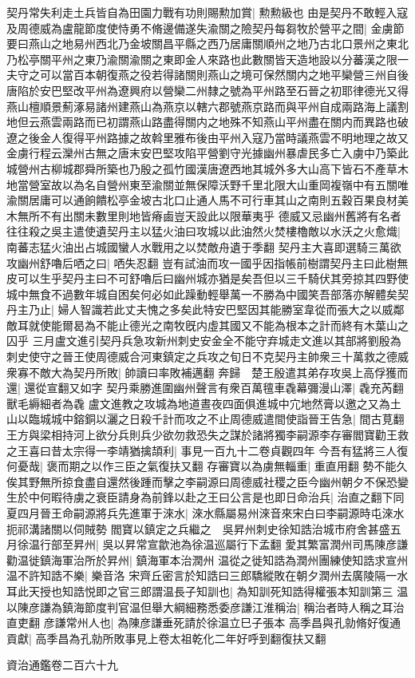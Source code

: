 契丹常失利走土兵皆自為田園力戰有功則賜勲加賞|{
	勲勲級也}
由是契丹不敢輕入寇及周德威為盧龍節度使恃勇不脩邊備遂失渝關之險契丹每芻牧於營平之間|{
	金虜節要曰燕山之地易州西北乃金坡關昌平縣之西乃居庸關順州之地乃古北口景州之東北乃松亭關平州之東乃渝關渝關之東即金人來路也此數關皆天造地設以分蕃漢之限一夫守之可以當百本朝復燕之役若得諸關則燕山之境可保然關内之地平欒營三州自後唐陷於安巴堅改平州為遼興府以營欒二州隸之號為平州路至石晉之初耶律德光又得燕山檀順景薊涿易諸州建燕山為燕京以轄六郡號燕京路而與平州自成兩路海上議割地但云燕雲兩路而已初謂燕山路盡得關内之地殊不知燕山平州盡在關内而異路也破遼之後金人復得平州路據之故斡里雅布後由平州入寇乃當時議燕雲不明地理之故又金虜行程云灤州古無之唐末安巴堅攻陷平營劉守光據幽州暴虐民多亡入虜中乃築此城營州古柳城郡舜所築也乃殷之孤竹國漢唐遼西地其城外多大山高下皆石不產草木地當營室故以為名自營州東至渝關並無保障沃野千里北限大山重岡複嶺中有五關唯渝關居庸可以通餉饋松亭金坡古北口止通人馬不可行車其山之南則五穀百果良材美木無所不有出關未數里則地皆瘠鹵豈天設此以限華夷乎}
德威又忌幽州舊將有名者往往殺之吳主遣使遺契丹主以猛火油曰攻城以此油然火焚樓櫓敵以水沃之火愈熾|{
	南蕃志猛火油出占城國蠻人水戰用之以焚敵舟遺于季翻}
契丹主大喜即選騎三萬欲攻幽州舒嚕后哂之曰|{
	哂失忍翻}
豈有試油而攻一國乎因指帳前樹謂契丹主曰此樹無皮可以生乎契丹主曰不可舒嚕后曰幽州城亦猶是矣吾但以三千騎伏其旁掠其四野使城中無食不過數年城自困矣何必如此躁動輕舉萬一不勝為中國笑吾部落亦解體矣契丹主乃止|{
	婦人智識若此丈夫愧之多矣此特安巴堅因其能勝室韋從而張大之以威鄰敵耳就使能爾曷為不能止德光之南牧旣内虛其國又不能為根本之計而終有木葉山之囚乎}
三月盧文進引契丹兵急攻新州刺史安金全不能守弃城走文進以其部將劉殷為刺史使守之晉王使周德威合河東鎮定之兵攻之旬日不克契丹主帥衆三十萬救之德威衆寡不敵大為契丹所敗|{
	帥讀曰率敗補邁翻}
奔歸　楚王殷遣其弟存攻吳上高俘獲而還|{
	還從宣翻又如字}
契丹乘勝進圍幽州聲言有衆百萬氊車毳幕彌漫山澤|{
	毳充芮翻獸毛縟細者為毳}
盧文進教之攻城為地道晝夜四面俱進城中宂地然膏以邀之又為土山以臨城城中鎔銅以灑之日殺千計而攻之不止周德威遣間使詣晉王告急|{
	間古莧翻}
王方與梁相持河上欲分兵則兵少欲勿救恐失之謀於諸將獨李嗣源李存審閻寶勸王救之王喜曰昔太宗得一李靖猶擒頡利|{
	事見一百九十二卷貞觀四年}
今吾有猛將三人復何憂哉|{
	褒而期之以作三臣之氣復扶又翻}
存審寶以為虜無輜重|{
	重直用翻}
勢不能久俟其野無所掠食盡自還然後踵而擊之李嗣源曰周德威社稷之臣今幽州朝夕不保恐變生於中何暇待虜之衰臣請身為前鋒以赴之王曰公言是也即日命治兵|{
	治直之翻下同}
夏四月晉王命嗣源將兵先進軍于淶水|{
	淶水縣屬易州淶音來宋白曰李嗣源時屯淶水扼祁溝諸關以伺賊勢}
閻寶以鎮定之兵繼之　吳昇州刺史徐知誥治城市府舍甚盛五月徐温行部至昇州|{
	吳以昇常宣歙池為徐温巡屬行下孟翻}
愛其繁富潤州司馬陳彦謙勸温徙鎮海軍治所於昇州|{
	鎮海軍本治潤州}
温從之徙知誥為潤州團練使知誥求宣州温不許知誥不樂|{
	樂音洛}
宋齊丘密言於知誥曰三郎驕縱敗在朝夕潤州去廣陵隔一水耳此天授也知誥悦即之官三郎謂温長子知訓也|{
	為知訓死知誥得權張本知訓第三}
温以陳彦謙為鎮海節度判官温但舉大綱細務悉委彦謙江淮稱治|{
	稱治者時人稱之耳治直吏翻}
彦謙常州人也|{
	為陳彦謙垂死請於徐温立巳子張本}
高季昌與孔勍脩好復通貢獻|{
	高季昌為孔勍所敗事見上卷太祖乾化二年好呼到翻復扶又翻}


資治通鑑卷二百六十九
